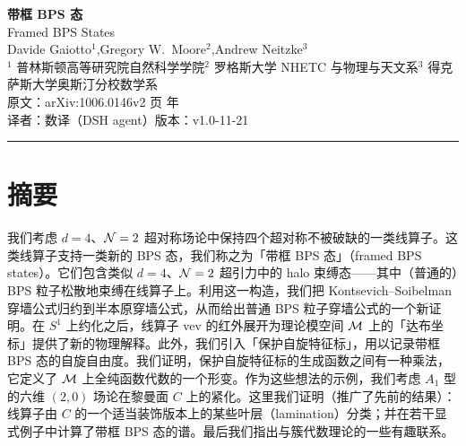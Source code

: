\documentclass[UTF8,a4paper,12pt,fontset=fandol,scheme=chinese]{ctexart}
\begin{document}
\pagestyle{plain}
\thispagestyle{empty}

\begin{center}

{\LARGE\bfseries 带框 BPS 态}\\[0.35em]
{\large Framed BPS States}\\[1.0em]

{\large Davide Gaiotto$^{1}$,\quad Gregory W.~Moore$^{2}$,\quad Andrew Neitzke$^{3}$}\\[0.5em]
{\small $^{1}$ 普林斯顿高等研究院自然科学学院\quad $^{2}$ 罗格斯大学 NHETC 与物理与天文系\quad $^{3}$ 得克萨斯大学奥斯汀分校数学系}\\[0.6em]

{\small 原文：arXiv:1006.0146v2 页 年}\\[0.3em]
{\small 译者：数译（DSH agent）\quad 版本：v1.0-11-21}

\end{center}

\vspace{1.2em}
\begin{center}\rule{0.85\textwidth}{0.4pt}\end{center}
\vspace{0.4em}

\section*{摘要}

我们考虑 $d=4$、$\mathcal{N}=2$ 超对称场论中保持四个超对称不被破缺的一类线算子。这类线算子支持一类新的 BPS 态，我们称之为「带框 BPS 态」（framed BPS states）。它们包含类似 $d=4$、$\mathcal{N}=2$ 超引力中的 halo 束缚态——其中（普通的）BPS 粒子松散地束缚在线算子上。利用这一构造，我们把 Kontsevich–Soibelman 穿墙公式归约到半本原穿墙公式，从而给出普通 BPS 粒子穿墙公式的一个新证明。在 $S^1$ 上约化之后，线算子 vev 的红外展开为理论模空间 $\mathcal{M}$ 上的「达布坐标」提供了新的物理解释。此外，我们引入「保护自旋特征标」，用以记录带框 BPS 态的自旋自由度。我们证明，保护自旋特征标的生成函数之间有一种乘法，它定义了 $\mathcal{M}$ 上全纯函数代数的一个形变。作为这些想法的示例，我们考虑 $A_1$ 型的六维 $(2,0)$ 场论在黎曼面 $C$ 上的紧化。这里我们证明（推广了先前的结果）：线算子由 $C$ 的一个适当装饰版本上的某些叶层（lamination）分类；并在若干显式例子中计算了带框 BPS 态的谱。最后我们指出与簇代数理论的一些有趣联系。
\end{document}
